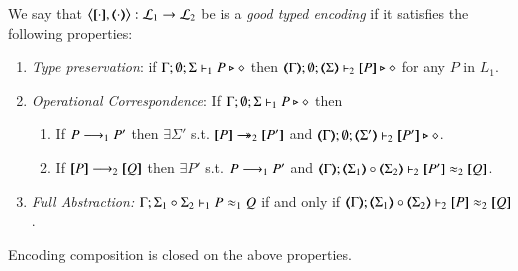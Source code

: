 \begin{definition}
	\label{def:ep}
	We say that $\enc{\cdot}{\cdot} : \tyl{L}_1 \to \tyl{L}_2$ be is a \emph{good  typed encoding} if it satisfies the following properties:
	
	\begin{enumerate}[1.]
		\item \emph{Type preservation}:	%
		if
			$\Gamma; \emptyset; \Sigma \vdash_1 P \triangleright \diamond$ then $\mapt{\Gamma}; \emptyset; \mapt{\Sigma} \proves_2 \map{P} \hastype \Proc$ for any   $P$ in $L_1$.

		\item \emph{Operational Correspondence}: If $\Gamma; \emptyset; \Sigma \vdash_1 P \triangleright \diamond$ then
		\begin{enumerate}[-]
			\item	If $P \longrightarrow_1 P'$ then $\exists \Sigma'$ s.t.
				$\map{P} \Red_2 \map{P'}$ and
				$\mapt{\Gamma}; \emptyset; \mapt{\Sigma'} \proves_2 \map{P'} \hastype \Proc$.
			\item	If $\map{P} \red_2 \map{Q}$ then
				$\exists P'$ s.t. $P \longrightarrow_1 P'$ and 
				$\mapt{\Gamma}; \mapt{\Sigma_1} \circ \mapt{\Sigma_2} \proves_2 \map{P'} \wb_2 \map{Q}$.
		\end{enumerate}
		
		\item \emph{Full Abstraction:} %
		$\Gamma; \Sigma_1 \circ \Sigma_2 \vdash_1 P \approx_1 Q $ if and only if $\mapt{\Gamma}; \mapt{\Sigma_1} \circ \mapt{\Sigma_2} \proves_2 \map{P} \wb_2 \map{Q} $.
	\end{enumerate}
\end{definition}

Encoding composition is closed on the above properties.

